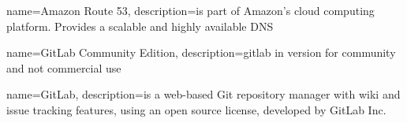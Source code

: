 
{
	name={Amazon Route 53},
	description={is part of Amazon's cloud computing platform. Provides a scalable and highly available \gls{DNS}}
}

{
	name={GitLab Community Edition},
	description={\gls{gitlab} in version for community and not commercial use}
}

{
	name={GitLab},
	description={is a web-based Git repository manager with wiki and issue tracking features, using an open source license, developed by GitLab Inc. \cite{bib:gitlab-wiki}}
}